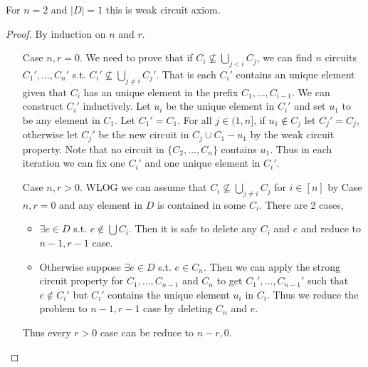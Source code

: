 \documentclass[12pt]{article}
\begin{document}
For $n=2$ and $|D|=1$ this is weak circuit axiom.

\begin{proof}
    By induction on $n$ and $r$.
    \begin{itemize}
        \item[Case] $n,r=0$. We need to prove that if $C_i\not \subseteq \bigcup_{j<i}C_j$, we can find $n$ circuits $C_1',\ldots,C_n'$ s.t. $C_i'\not \subseteq \bigcup_{j\not=i}C_j'$. That is each $C_i'$ contains an unique element given that $C_i$ has an unique element in the prefix $C_1,\dots,C_{i-1}$. We can construct $C_i'$ inductively. Let $u_i$ be the unique element in $C_i'$ and set $u_1$ to be any element in $C_1$. Let $C_1'=C_1$. For all $j\in (1,n]$, if $u_1\notin C_j$ let $C_j'=C_j$, otherwise let $C_j'$ be the new circuit in $C_j\cup C_1-u_1$ by the weak circuit property. Note that no circuit in $\{C_2,\dots,C_n\}$ contains $u_1$. Thus in each iteration we can fix one $C_i'$ and one unique element in $C_i'$.
        \item[Case] $n,r>0$. WLOG we can assume that $C_i\not\subseteq \bigcup_{j\not=i}C_j$ for $i\in [n]$ by Case $n,r=0$ and any element in $D$ is contained in some $C_i$. There are 2 cases,
        \begin{itemize}
            \item $\exists e\in D$ s.t. $e\notin \bigcup C_i$. Then it is safe to delete any $C_i$ and $e$ and reduce to $n-1,r-1$ case.
            \item Otherwise suppose $\exists e\in D$ s.t. $e\in C_n$. Then we can apply the strong circuit property for $C_1,\dots,C_{n-1}$ and $C_n$ to get $C_1',\dots,C_{n-1}'$ such that $e\notin C_i'$ but $C_i'$ contains the unique element $u_i$ in $C_i$. Thus we reduce the problem to $n-1,r-1$ case by deleting $C_n$ and $e$.
        \end{itemize}
        Thus every $r>0$ case can be reduce to $n-r,0$.
    \end{itemize}
\end{proof}
\end{document}
